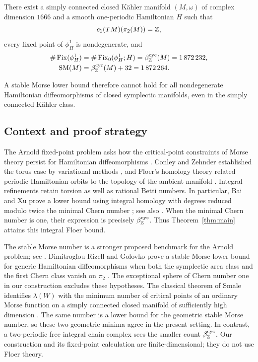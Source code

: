 \begin{theorem}
\label{thm:main}
There exist a simply connected closed K\"ahler manifold $(M,\omega)$
of complex dimension $1666$ and a smooth one-periodic Hamiltonian $H$
such that
\[
 c_1(TM)(\pi_2(M))=\mathbb Z,
\]
every fixed point of $\phi_H^1$ is nondegenerate, and
\begin{align*}
 \#\operatorname{Fix}(\phi_H^1)
 &=\#\operatorname{Fix}_0(\phi_H^1;H)
  =\beta_{\mathbb Z}^{\mathrm{cyc}}(M)=1\,872\,232,\\
 \operatorname{SM}(M)&=\beta_{\mathbb Z}^{\mathrm{cyc}}(M)+32=1\,872\,264.
\end{align*}
\end{theorem}

A stable Morse lower bound therefore cannot hold for all
nondegenerate Hamiltonian diffeomorphisms of closed symplectic
manifolds, even in the simply connected K\"ahler class.

\subsection*{Context and proof strategy}
The Arnold fixed-point problem asks how the critical-point constraints
of Morse theory persist for Hamiltonian diffeomorphisms
\cite{Arnold1986}. Conley and Zehnder established the torus case by
variational methods \cite{ConleyZehnder1983}, and Floer's homology
theory related periodic Hamiltonian orbits to the topology of the
ambient manifold \cite{Floer1989}. Integral refinements retain
torsion as well as rational Betti numbers. In particular, Bai and Xu
prove a lower bound using integral homology with degrees reduced
modulo twice the minimal Chern number
\cite[Theorem~A]{BaiXu2022}; see also
\cite[Corollary~1.2]{BaiXu2026}. When the minimal Chern number is
one, their expression is precisely
$\beta_{\mathbb Z}^{\mathrm{cyc}}$. Thus Theorem~\ref{thm:main}
attains this integral Floer bound.

The stable Morse number is a stronger proposed benchmark for the
Arnold problem; see \cite[Conjecture~1.2]{Golovko2020}.
Dimitroglou Rizell and Golovko prove a stable Morse lower bound for
generic Hamiltonian diffeomorphisms when both the symplectic area
class and the first Chern class vanish on $\pi_2$
\cite[Corollary~1.4]{DRG2017}. The exceptional sphere of Chern
number one in our construction excludes these hypotheses.
The classical theorem of Smale identifies $\lambda(W)$ with the
minimum number of critical points of an ordinary Morse function on a
simply connected closed manifold of sufficiently high dimension
\cite{Smale1963,Cerf1962}. The same number is a lower bound for the
geometric stable Morse number, so these two geometric minima agree
in the present setting. In contrast, a two-periodic free integral
chain complex sees the smaller count $\beta_{\mathbb Z}^{\mathrm{cyc}}$.
Our construction and its fixed-point calculation are finite-dimensional;
they do not use Floer theory.

